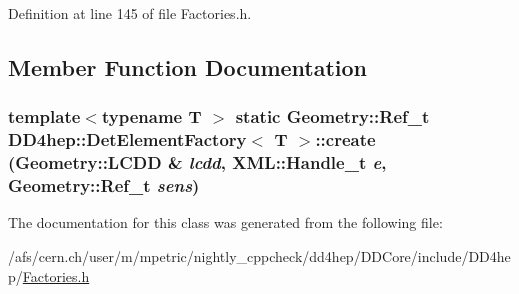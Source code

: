 Definition at line 145 of file Factories.h.

\subsection{Member Function Documentation}
\hypertarget{class_d_d4hep_1_1_det_element_factory_aaf2f69411f75e9d157627298c3c5fb95}{
\subsubsection[{create}]{\setlength{\rightskip}{0pt plus 5cm}template$<$typename T $>$ static Geometry::Ref\_\-t {\bf DD4hep::DetElementFactory}$<$ {\bf T} $>$::create ({\bf Geometry::LCDD} \& {\em lcdd}, \/  {\bf XML::Handle\_\-t} {\em e}, \/  Geometry::Ref\_\-t {\em sens})}}
\label{class_d_d4hep_1_1_det_element_factory_aaf2f69411f75e9d157627298c3c5fb95}


The documentation for this class was generated from the following file:\begin{DoxyCompactItemize}
\item 
/afs/cern.ch/user/m/mpetric/nightly\_\-cppcheck/dd4hep/DDCore/include/DD4hep/\hyperlink{_d_d_core_2include_2_d_d4hep_2_factories_8h}{Factories.h}\end{DoxyCompactItemize}
